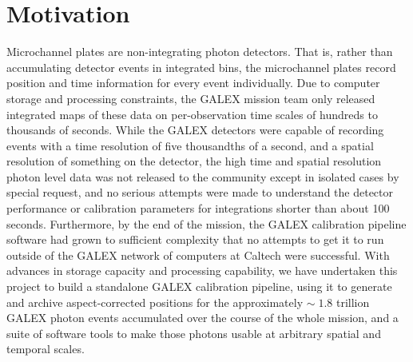 \documentclass[preprint]{aastex}
\begin{document}
\section{Motivation}
\label{motivation}
Microchannel plates are non-integrating photon detectors. That is, rather than accumulating detector events in integrated bins, the microchannel plates record position and time information for every event individually. Due to computer storage and processing constraints, the GALEX mission team only released integrated maps of these data on per-observation time scales of hundreds to thousands of seconds. While the GALEX detectors were capable of recording events with a time resolution of five thousandths of a second, and a spatial resolution of {\color{red}something} on the detector, the high time and spatial resolution photon level data was not released to the community except in isolated cases by special request, and no serious attempts were made to understand the detector performance or calibration parameters for integrations shorter than about 100 seconds. Furthermore, by the end of the mission, the GALEX calibration pipeline software had grown to sufficient complexity that no attempts to get it to run outside of the GALEX network of computers at Caltech were successful. With advances in storage capacity and processing capability, we have undertaken this project to build a standalone GALEX calibration pipeline, using it to generate and archive aspect-corrected positions for the approximately $\sim\;1.8$ trillion GALEX photon events accumulated over the course of the whole mission, and a suite of software tools to make those photons usable at arbitrary spatial and temporal scales.
\end{document}
